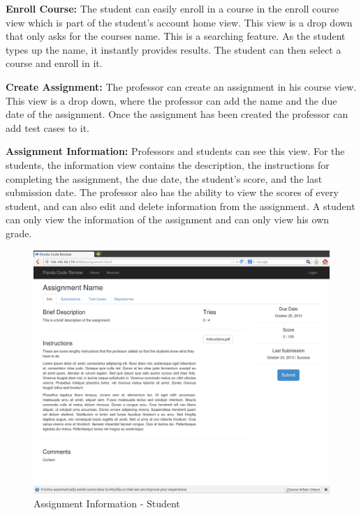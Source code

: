 \textbf{Enroll Course:} The student can easily enroll in a course in the
enroll course view which is part of the student's account home view. This view
is a drop down that only asks for the courses name. This is a searching feature.
As the student types up the name, it instantly provides results. The student
can then select a course and enroll in it.

\textbf{Create Assignment:} The professor can create an assignment in his
course view. This view is a drop down, where the professor can add the name and
the due date of the assignment. Once the assignment has been created the
professor can add test cases to it.

\textbf{Assignment Information:} Professors and students can see this
view. For the students, the information view contains the description, the
instructions for completing the assignment, the due date, the student's score,
and the last submission date. The professor also has the ability to view the
scores of every student, and can also edit and delete information from the
assignment. A student can only view the information of the assignment and can
only view his own grade.

\begin{figure}[H]
	\centering
	\includegraphics[width=\textwidth]{img/assignment-info}
	\caption{Assignment Information - Student}
\end{figure}

